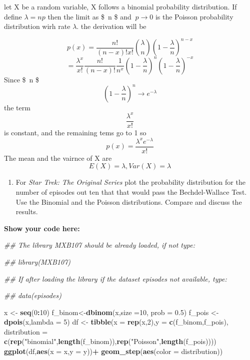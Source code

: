 \documentclass[
]{article}
\newenvironment{Shaded}{\begin{snugshade}}{\end{snugshade}}
\newcommand{\CommentTok}[1]{\textcolor[rgb]{0.56,0.35,0.01}{\textit{#1}}}
\newcommand{\DataTypeTok}[1]{\textcolor[rgb]{0.13,0.29,0.53}{#1}}
\newcommand{\DecValTok}[1]{\textcolor[rgb]{0.00,0.00,0.81}{#1}}
\newcommand{\FloatTok}[1]{\textcolor[rgb]{0.00,0.00,0.81}{#1}}
\newcommand{\KeywordTok}[1]{\textcolor[rgb]{0.13,0.29,0.53}{\textbf{#1}}}
\newcommand{\NormalTok}[1]{#1}
\newcommand{\OperatorTok}[1]{\textcolor[rgb]{0.81,0.36,0.00}{\textbf{#1}}}
\newcommand{\StringTok}[1]{\textcolor[rgb]{0.31,0.60,0.02}{#1}}
\providecommand{\tightlist}{%
  \setlength{\itemsep}{0pt}\setlength{\parskip}{0pt}}
\begin{document}
let X be a random variable, X follows a binomial probability
distribution. If define \(\lambda = np\) then the limit as \$~n
\rightarrow \infty \$ and \(\ p \rightarrow 0\) is the Poisson
probability distribution wirh rate \(\lambda\). the derivation will be

\[
p(x) = \frac{n!}{(n-x)!x!}\binom{ \lambda }{n}(1-\frac{\lambda}{n})^{n-x}
\] \[
= \frac{\lambda^x}{x!}\frac{n!}{(n-x)!}\frac{1}{n^x}(1-\frac{\lambda}{n})^{n}(1-\frac{\lambda}{n})^{-x}
\] Since \$~n \rightarrow \infty \$ \[
(1-\frac{\lambda}{n})^n \rightarrow e^{-\lambda} 
\] the term \[
\frac{\lambda^x}{x!}
\] is constant, and the remaining tems go to 1 so \[
p(x) = \frac{\lambda^xe^{-\lambda}}{x!}
\] The mean and the vairnce of X are \[
E(X) = \lambda,
Var(X) = \lambda
\]

\begin{enumerate}
\def\labelenumi{\alph{enumi}.}
\setcounter{enumi}{1}
\tightlist
\item
  For \emph{Star Trek: The Original Series} plot the probability
  distribution for the number of episodes out ten that that would pass
  the Bechdel-Wallace Test. Use the Binomial and the Poisson
  distributions. Compare and discuss the results.
\end{enumerate}

\textbf{Show your code here:}

\begin{Shaded}
\begin{Highlighting}[]
\CommentTok{##  The library MXB107 should be already loaded, if not type:}

\CommentTok{##  library(MXB107)}

\CommentTok{##  If after loading the library if the dataset episodes not available, type:}

\CommentTok{##  data(episodes)}


\NormalTok{x <-}\StringTok{ }\KeywordTok{seq}\NormalTok{(}\DecValTok{0}\OperatorTok{:}\DecValTok{10}\NormalTok{)}
\NormalTok{f_binom<-}\KeywordTok{dbinom}\NormalTok{(x,}\DataTypeTok{size =}\DecValTok{10}\NormalTok{, }\DataTypeTok{prob =} \FloatTok{0.5}\NormalTok{)}
\NormalTok{f_pois <-}\StringTok{ }\KeywordTok{dpois}\NormalTok{(x,}\DataTypeTok{lambda =} \DecValTok{5}\NormalTok{)}
\NormalTok{df <-}\StringTok{ }\KeywordTok{tibble}\NormalTok{(}\DataTypeTok{x =} \KeywordTok{rep}\NormalTok{(x,}\DecValTok{2}\NormalTok{),}\DataTypeTok{y =} \KeywordTok{c}\NormalTok{(f_binom,f_pois),}
             \DataTypeTok{distribution =} \KeywordTok{c}\NormalTok{(}\KeywordTok{rep}\NormalTok{(}\StringTok{"binomial"}\NormalTok{,}\KeywordTok{length}\NormalTok{(f_binom)),}\KeywordTok{rep}\NormalTok{(}\StringTok{"Poisson"}\NormalTok{,}\KeywordTok{length}\NormalTok{(f_pois))))}
\KeywordTok{ggplot}\NormalTok{(df,}\KeywordTok{aes}\NormalTok{(}\DataTypeTok{x =}\NormalTok{ x,}\DataTypeTok{y =}\NormalTok{ y))}\OperatorTok{+}
\StringTok{  }\KeywordTok{geom_step}\NormalTok{(}\KeywordTok{aes}\NormalTok{(}\DataTypeTok{color =}\NormalTok{ distribution))}
\end{Highlighting}
\end{Shaded}
\end{document}

